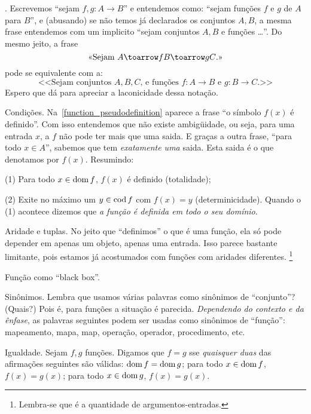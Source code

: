 \note.
Escrevemos ``sejam $f,g : A \to B$'' e entendemos como:
``sejam funções $f$ e $g$ de $A$ para $B$'', e (abusando) se não temos já
declarados os conjuntos $A,B$, a mesma frase entendemos com um implicito
``sejam conjuntos $A,B$ e funções \dots''.
Do mesmo jeito, a frase
$$
\text{<<{Sejam $A \toarrow f B \toarrow g C$.}>>}
$$
pode se equivalente com a:
$$
\text{<<{Sejam conjuntos $A,B,C$, e funções $f:A\to B$ e $g:B\to C$.}>>}
$$
Espero que dá para apreciar a laconicidade dessa notação.

\note Condições.
\label{functionhood_conditions}%
Na~\ref{function_pseudodefinition} aparece a frase
``o símbolo $f(x)$ é definido''.
Com isso entendemos que não existe ambigüidade, ou seja, para uma entrada $x$,
a $f$ não pode ter mais que uma saida.
E graças a outra frase, ``para todo $x\in A$'', sabemos que tem
\emph{exatamente uma} saida.  Esta saida é o que denotamos por $f(x)$.
Resumindo:
\beginil
\item{(1)} Para todo $x\in\operatorname{dom} f$, $f(x)$ é definido (totalidade);
\item{(2)} Exite no máximo um $y\in\operatorname{cod} f$ com $f(x) = y$ (determinicidade).
\endil
\noindent
Quando o (1) acontece dizemos que \emph{a função é definida em todo o seu domínio}.

\note Aridade e tuplas.
%
No jeito que ``definimos'' o que é uma função, ela só pode depender
em apenas um objeto, apenas uma entrada.
Isso parece bastante limitante, pois estamos já acostumados
com funções com aridades diferentes.%
\footnote{Lembra-se que  é a quantidade de
argumentos-entradas.}

\TODO Função como ``black box''.

\note Sinônimos.
%
%
%
%
%
%
%
Lembra que usamos várias palavras como sinônimos de ``conjunto''?
(Quais?)
Pois é, para funções a situação é parecida.
\emph{Dependendo do contexto e da ênfase},
as palavras seguintes podem ser usadas como
sinônimos de ``função'':
mapeamento,
mapa,
map,
operação,
operador,
procedimento,
etc.

 Igualdade.
\label{f_eq_g}%
Sejam $f,g$ funções.
Digamos que $f=g$ sse \emph{quaisquer duas} das afirmações seguintes são válidas:
\beginol
\li $\operatorname{dom} f = \operatorname{dom} g$;
\li para todo $x \in \operatorname{dom} f$, $f(x) = g(x)$;
\li para todo $x \in \operatorname{dom} g$, $f(x) = g(x)$.
\endol

